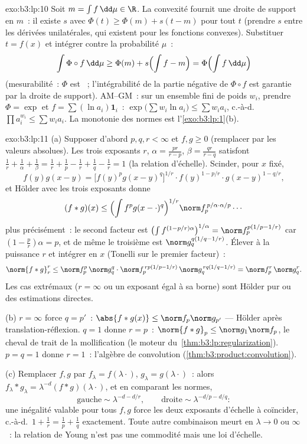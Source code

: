 \begin{solution}{exo:b3:lp:10}
Soit $m = \int f\,\dd\mu \in \R$. La convexité fournit une
droite de support en $m$~: il existe $s$ avec $\Phi(t) \geq
\Phi(m) + s(t - m)$ pour tout $t$ (prendre $s$ entre les
dérivées unilatérales, qui existent pour les fonctions
convexes). Substituer $t = f(x)$ et intégrer contre la
probabilité $\mu$~:
\[
\int\Phi\circ f\,\dd\mu \geq \Phi(m) + s\Bigl(\int f - m\Bigr)
= \Phi\Bigl(\int f\,\dd\mu\Bigr)
\]
(mesurabilité~: $\Phi$ est ~; l'intégrabilité de la
partie négative de $\Phi\circ f$ est garantie par la droite
de support). AM--GM~: sur un ensemble fini de poids $w_i$,
prendre $\Phi = \exp$ et $f = \sum(\ln a_i)\mathbf 1_i$~:
$\exp\bigl(\sum w_i\ln a_i\bigr) \leq \sum w_ia_i$, c.-à-d.\
$\prod a_i^{w_i} \leq \sum w_ia_i$. La monotonie des normes
est l'\cref{exo:b3:lp:1}(b).
\end{solution}

\begin{solution}{exo:b3:lp:11}
(a) Supposer d'abord $p, q, r < \infty$ et $f, g \geq 0$
(remplacer par les valeurs absolues). Les trois exposants
$r$, $\alpha = \frac{pr}{r-p}$, $\beta = \frac{qr}{r-q}$
satisfont $\frac1r + \frac1\alpha + \frac1\beta = \frac1r +
\frac1p - \frac1r + \frac1q - \frac1r = 1$ (la relation
d'échelle). Scinder, pour $x$ fixé,
\[
f(y)g(x-y) = \bigl[f(y)^pg(x-y)^q\bigr]^{1/r}\cdot
f(y)^{1 - p/r}\cdot g(x-y)^{1 - q/r},
\]
et Hölder avec les trois exposants donne
\[
(f*g)(x) \leq \Bigl(\int f^pg(x-\cdot)^q\Bigr)^{1/r}
\norm f_p^{\,p/\alpha\cdot\alpha/p}\cdots
\]
plus précisément~: le second facteur est
$\bigl(\int f^{(1-p/r)\alpha}\bigr)^{1/\alpha} =
\norm f_p^{p(1/p - 1/r)}$ car $(1 - \frac pr)\alpha = p$,
et de même le troisième est $\norm g_q^{q(1/q - 1/r)}$.
Élever à la puissance $r$ et intégrer en $x$ (Tonelli sur
le premier facteur)~:
\[
\norm{f*g}_r^r \leq \norm f_p^p\,\norm g_q^q\cdot
\norm f_p^{\,rp(1/p - 1/r)}\,\norm g_q^{\,rq(1/q - 1/r)}
= \norm f_p^r\,\norm g_q^r .
\]
Les cas extrémaux ($r = \infty$ ou un exposant égal à sa
borne) sont Hölder pur ou des estimations directes.

(b) $r = \infty$ force $q = p'$~: $\abs{f*g(x)} \leq \norm
f_p\norm g_{p'}$ --- Hölder après
translation-réflexion. $q = 1$ donne $r = p$~:
$\norm{f*g}_p \leq \norm g_1\norm f_p$, le cheval de trait
de la mollification (le moteur
du~\cref{thm:b3:lp:regularization}). $p = q = 1$ donne $r
= 1$~: l'algèbre de convolution
(\cref{thm:b3:product:convolution}).

(c) Remplacer $f, g$ par $f_\lambda = f(\lambda\cdot)$,
$g_\lambda = g(\lambda\cdot)$~: alors $f_\lambda*g_\lambda
= \lambda^{-d}(f*g)(\lambda\cdot)$, et en comparant les
normes,
\[
\text{gauche} \sim \lambda^{-d - d/r}, \qquad
\text{droite} \sim \lambda^{-d/p - d/q} :
\]
une inégalité valable pour tous $f, g$ force les deux
exposants d'échelle à coïncider, c.-à-d.\ $1 + \frac1r =
\frac1p + \frac1q$ exactement. Toute autre combinaison
meurt en $\lambda \to 0$ ou $\infty$~: la relation de Young
n'est pas une commodité mais une loi d'échelle.
\end{solution}

